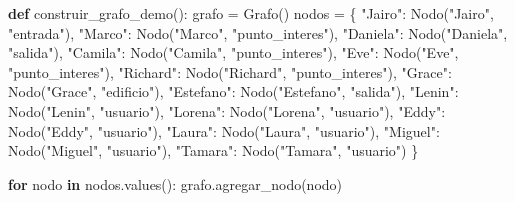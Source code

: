 \documentclass[
  spanish,
  letterpaper,
  DIV=11,
  numbers=noendperiod]{scrartcl}
\newenvironment{Shaded}{\begin{snugshade}}{\end{snugshade}}
\newcommand{\ControlFlowTok}[1]{\textcolor[rgb]{0.00,0.23,0.31}{\textbf{#1}}}
\newcommand{\KeywordTok}[1]{\textcolor[rgb]{0.00,0.23,0.31}{\textbf{#1}}}
\newcommand{\NormalTok}[1]{\textcolor[rgb]{0.00,0.23,0.31}{#1}}
\newcommand{\OperatorTok}[1]{\textcolor[rgb]{0.37,0.37,0.37}{#1}}
\newcommand{\StringTok}[1]{\textcolor[rgb]{0.13,0.47,0.30}{#1}}
\begin{document}
\begin{Shaded}
\begin{Highlighting}[]
\KeywordTok{def}\NormalTok{ construir\_grafo\_demo():}
\NormalTok{    grafo }\OperatorTok{=}\NormalTok{ Grafo()}
\NormalTok{    nodos }\OperatorTok{=}\NormalTok{ \{}
        \StringTok{"Jairo"}\NormalTok{: Nodo(}\StringTok{"Jairo"}\NormalTok{, }\StringTok{"entrada"}\NormalTok{),}
        \StringTok{"Marco"}\NormalTok{: Nodo(}\StringTok{"Marco"}\NormalTok{, }\StringTok{"punto\_interes"}\NormalTok{),}
        \StringTok{"Daniela"}\NormalTok{: Nodo(}\StringTok{"Daniela"}\NormalTok{, }\StringTok{"salida"}\NormalTok{),}
        \StringTok{"Camila"}\NormalTok{: Nodo(}\StringTok{"Camila"}\NormalTok{, }\StringTok{"punto\_interes"}\NormalTok{),}
        \StringTok{"Eve"}\NormalTok{: Nodo(}\StringTok{"Eve"}\NormalTok{, }\StringTok{"punto\_interes"}\NormalTok{),}
        \StringTok{"Richard"}\NormalTok{: Nodo(}\StringTok{"Richard"}\NormalTok{, }\StringTok{"punto\_interes"}\NormalTok{),}
        \StringTok{"Grace"}\NormalTok{: Nodo(}\StringTok{"Grace"}\NormalTok{, }\StringTok{"edificio"}\NormalTok{),}
        \StringTok{"Estefano"}\NormalTok{: Nodo(}\StringTok{"Estefano"}\NormalTok{, }\StringTok{"salida"}\NormalTok{),}
        \StringTok{"Lenin"}\NormalTok{: Nodo(}\StringTok{"Lenin"}\NormalTok{, }\StringTok{"usuario"}\NormalTok{),}
        \StringTok{"Lorena"}\NormalTok{: Nodo(}\StringTok{"Lorena"}\NormalTok{, }\StringTok{"usuario"}\NormalTok{),}
        \StringTok{"Eddy"}\NormalTok{: Nodo(}\StringTok{"Eddy"}\NormalTok{, }\StringTok{"usuario"}\NormalTok{),}
        \StringTok{"Laura"}\NormalTok{: Nodo(}\StringTok{"Laura"}\NormalTok{, }\StringTok{"usuario"}\NormalTok{),}
        \StringTok{"Miguel"}\NormalTok{: Nodo(}\StringTok{"Miguel"}\NormalTok{, }\StringTok{"usuario"}\NormalTok{),}
        \StringTok{"Tamara"}\NormalTok{: Nodo(}\StringTok{"Tamara"}\NormalTok{, }\StringTok{"usuario"}\NormalTok{)}
\NormalTok{    \}}

    \ControlFlowTok{for}\NormalTok{ nodo }\KeywordTok{in}\NormalTok{ nodos.values():}
\NormalTok{        grafo.agregar\_nodo(nodo)}


\end{Highlighting}
\end{Shaded}
\end{document}
